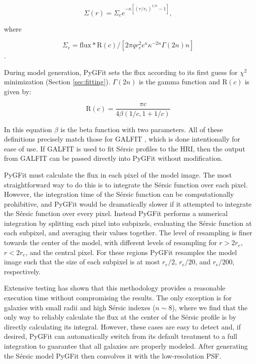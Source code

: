 \documentclass[preprint]{aastex}
\newcommand{\sersic}{S\'{e}rsic}
\newcommand{\galfit}{GALFIT}
\newcommand{\pygfit}{PyGFit}
\begin{document}
\begin{equation}\Sigma(r) = \Sigma_{e}e^{-\kappa[(r/r_e)^{1/n}-1]},\end{equation}

where

\begin{equation}\Sigma_e = \textrm{flux}*\textrm{R}(c) / [ 2{\pi}qr_e^2e^{\kappa}\kappa^{-2n}\Gamma(2n)n ]\end{equation}.

During model generation, \pygfit{} sets the flux according to its first guess for $\chi^2$ minimization (Section \ref{sec:fitting}).  $\Gamma(2n)$ is the gamma function and $\textrm{R}(c)$ is given by:

\begin{equation}\textrm{R}(c) = \frac{{\pi}c}{4\beta(1/c, 1+1/c)}\end{equation}

{\noindent}In this equation $\beta$ is the beta function with two parameters.  All of these definitions precisely match those for \galfit{} \citep{peng02,peng10}, which is done intentionally for ease of use.  If \galfit{} is used to fit \sersic{} profiles to the HRI, then the output from \galfit{} can be passed directly into \pygfit{} without modification.

\pygfit{} must calculate the flux in each pixel of the model image.  The most straightforward way to do this is to integrate the \sersic{} function over each pixel.  However, the integration time of the \sersic{} function can be computationally prohibitive, and \pygfit{} would be dramatically slower if it attempted to integrate the \sersic{} function over every pixel.  Instead \pygfit{} performs a numerical integration by splitting each pixel into subpixels, evaluating the \sersic{} function at each subpixel, and averaging their values together.  The level of resampling is finer towards the center of the model, with different levels of resampling for $r>2r_e$, $r<2r_e$, and the central pixel.  For these regions \pygfit{} resamples the model image such that the size of each subpixel is at most $r_e/2$, $r_e/20$, and $r_e/200$, respectively.

Extensive testing has shown that this methodology provides a reasonable execution time without compromising the results.  The only exception is for galaxies with small radii and high \sersic{} indexes ($n \sim 8$), where we find that the only way to reliably calculate the flux at the center of the \sersic{} profile is by directly calculating its integral.  However, these cases are easy to detect and, if desired, \pygfit{} can automatically switch from its default treatment to a full integration to guarantee that all galaxies are properly modeled.  After generating the \sersic{} model \pygfit{} then convolves it with the low-resolution PSF.
\end{document}
